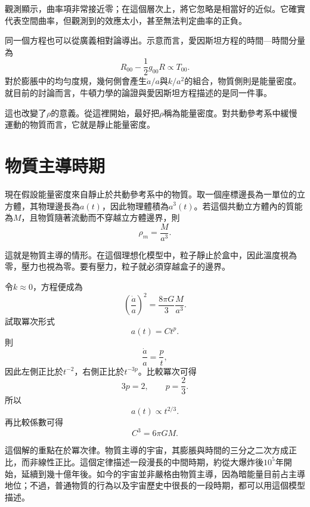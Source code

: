 觀測顯示，曲率項非常接近零；在這個層次上，將它忽略是相當好的近似。它確實代表空間曲率，但觀測到的效應太小，甚至無法判定曲率的正負。

同一個方程也可以從廣義相對論導出。示意而言，愛因斯坦方程的時間—時間分量為
\begin{equation}
R_{00}-\frac{1}{2}g_{00}R \propto T_{00}.
\end{equation}
對於膨脹中的均勻度規，幾何側會產生\(\dot a/a\)與\(k/a^2\)的組合，物質側則是能量密度。就目前的討論而言，牛頓力學的論證與愛因斯坦方程描述的是同一件事。

這也改變了\(\rho\)的意義。從這裡開始，最好把\(\rho\)稱為能量密度。對共動參考系中緩慢運動的物質而言，它就是靜止能量密度。

\section{物質主導時期}

現在假設能量密度來自靜止於共動參考系中的物質。取一個座標邊長為一單位的立方體，其物理邊長為\(a(t)\)，因此物理體積為\(a^3(t)\)。若這個共動立方體內的質能為\(M\)，且物質隨著流動而不穿越立方體邊界，則
\begin{equation}
\rho_m=\frac{M}{a^3}.
\end{equation}

這就是物質主導的情形。在這個理想化模型中，粒子靜止於盒中，因此溫度視為零，壓力也視為零。要有壓力，粒子就必須穿越盒子的邊界。

令\(k\approx 0\)，方程便成為
\begin{equation}
\left(\frac{\dot a}{a}\right)^2=\frac{8\pi G}{3}\frac{M}{a^3}.
\end{equation}
試取冪次形式
\begin{equation}
a(t)=Ct^p.
\end{equation}
則
\begin{equation}
\frac{\dot a}{a}=\frac{p}{t},
\end{equation}
因此左側正比於\(t^{-2}\)，右側正比於\(t^{-3p}\)。比較冪次可得
\begin{equation}
3p=2,
\qquad
p=\frac{2}{3}.
\end{equation}
所以
\begin{equation}
a(t)\propto t^{2/3}.
\end{equation}
再比較係數可得
\begin{equation}
C^3=6\pi G M.
\end{equation}

這個解的重點在於冪次律。物質主導的宇宙，其膨脹與時間的三分之二次方成正比，而非線性正比。這個定律描述一段漫長的中間時期，約從大爆炸後\(10^5\)年開始，延續到幾十億年後。如今的宇宙並非嚴格由物質主導，因為暗能量目前占主導地位；不過，普通物質的行為以及宇宙歷史中很長的一段時期，都可以用這個模型描述。

